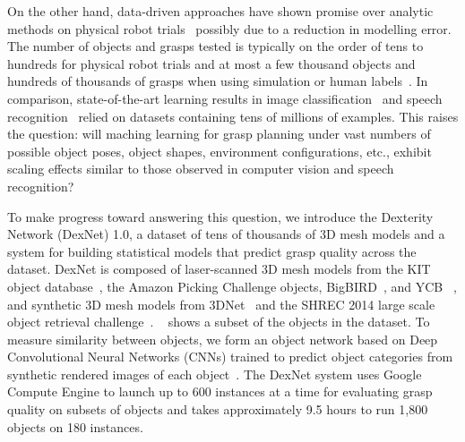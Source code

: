 On the other hand, data-driven approaches have shown promise over analytic methods on physical robot trials~\cite{balasubramanian2012physical, herzog2014learning} possibly due to a reduction in modelling error.
The number of objects and grasps tested is typically on the order of tens to hundreds for physical robot trials and at most a few thousand objects and hundreds of thousands of grasps when using simulation or human labels~\cite{goldfeder2009columbia, lenz2015deep, kappler2015leveraging}.
In comparison, state-of-the-art learning results in image classification~\cite{deng2009imagenet, krizhevsky2012imagenet} and speech recognition~\cite{cieri2004fisher, hannun2014deepspeech} relied on datasets containing tens of millions of examples.
This raises the question: will maching learning for grasp planning under vast numbers of possible object poses, object shapes, environment configurations, etc., exhibit scaling effects similar to those observed in computer vision and speech recognition?


To make progress toward answering this question, we introduce the Dexterity Network (DexNet) 1.0, a dataset of tens of thousands of 3D mesh models and a system for building statistical models that predict grasp quality across the dataset.
DexNet is composed of laser-scanned 3D mesh models from the KIT object database~\cite{kasper2012kit}, the Amazon Picking Challenge objects, BigBIRD~\cite{singh2014bigbird}, and YCB ~\cite{calli2015benchmarking}, and synthetic 3D mesh models from 3DNet~\cite{wohlkinger20123dnet} and the SHREC 2014 large scale object retrieval challenge~\cite{li2015comparison}.
~ shows a subset of the objects in the dataset.
To measure similarity between objects, we form an object network based on Deep Convolutional Neural Networks (CNNs) trained to predict object categories from synthetic rendered images of each object~\cite{aubry2015understanding, li2015comparison}.
The DexNet system uses Google Compute Engine to launch up to 600 instances at a time for evaluating grasp quality on subsets of objects and takes approximately 9.5 hours to run 1,800 objects on 180 instances.

